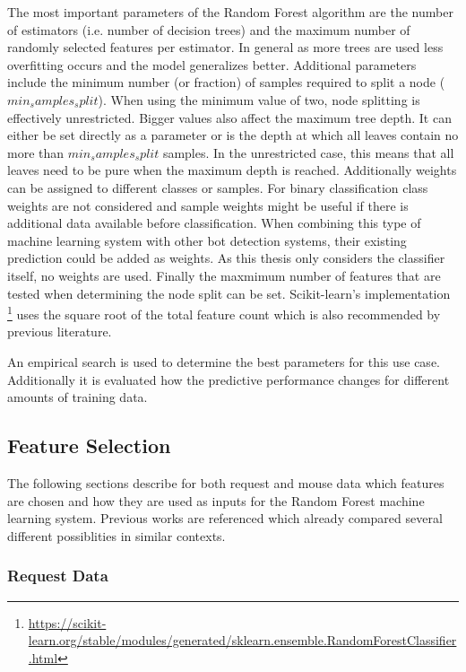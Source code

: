 \documentclass[
    fontsize=12pt,
    headings=small,
    parskip=half,           %
    bibliography=totoc,
    numbers=noenddot,       %
    open=any,               %
    final,                   %
    table
]{scrreprt}
\begin{document}
The most important parameters of the Random Forest algorithm are the number of estimators (i.e. number of decision trees) and the maximum number of randomly selected features per estimator. In general as more trees are used less overfitting occurs and the model generalizes better. Additional parameters include the minimum number (or fraction) of samples required to split a node ($min_samples_split$). When using the minimum value of two, node splitting is effectively unrestricted. Bigger values also affect the maximum tree depth. It can either be set directly as a parameter or is the depth at which all leaves contain no more than $min_samples_split$ samples. In the unrestricted case, this means that all leaves need to be pure when the maximum depth is reached. Additionally weights can be assigned to different classes or samples. For binary classification class weights are not considered and sample weights might be useful if there is additional data available before classification. When combining this type of machine learning system with other bot detection systems, their existing prediction could be added as weights. As this thesis only considers the classifier itself, no weights are used. Finally the maxmimum number of features that are tested when determining the node split can be set. Scikit-learn's implementation \footnote{\url{https://scikit-learn.org/stable/modules/generated/sklearn.ensemble.RandomForestClassifier.html}} uses the square root of the total feature count which is also recommended by previous literature. \cite{Hastie2009}

An empirical search is used to determine the best parameters for this use case. Additionally it is evaluated how the predictive performance changes for different amounts of training data.

\subsection{Feature Selection}

The following sections describe for both request and mouse data which features are chosen and how they are used as inputs for the Random Forest machine learning system. Previous works are referenced which already compared several different possiblities in similar contexts.

\label{concept_request_data}
\subsubsection{Request Data}
\end{document}
